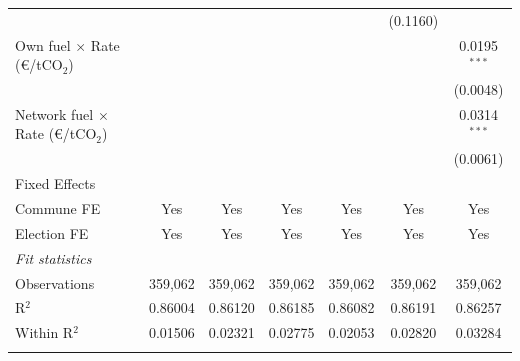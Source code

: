 \begin{tabular}{lcccccc}
                                                &               &               &                &                & (0.1160)        &   \\   
   Own fuel $\times$ Rate (\euro/tCO$_2$)       &               &               &                &                &                 & 0.0195$^{***}$\\   
                                                &               &               &                &                &                 & (0.0048)\\   
   Network fuel $\times$ Rate (\euro/tCO$_2$)   &               &               &                &                &                 & 0.0314$^{***}$\\   
                                                &               &               &                &                &                 & (0.0061)\\   
   \midrule Fixed Effects\\
   Commune FE                                   & Yes           & Yes           & Yes            & Yes            & Yes             & Yes\\  
   Election FE                                  & Yes           & Yes           & Yes            & Yes            & Yes             & Yes\\  
   \midrule
   \emph{Fit statistics}\\
   Observations                                 & 359,062       & 359,062       & 359,062        & 359,062        & 359,062         & 359,062\\  
   R$^2$                                        & 0.86004       & 0.86120       & 0.86185        & 0.86082        & 0.86191         & 0.86257\\  
   Within R$^2$                                 & 0.01506       & 0.02321       & 0.02775        & 0.02053        & 0.02820         & 0.03284\\  
   \midrule \midrule & \tabularnewline
\end{tabular}
\par\endgroup

